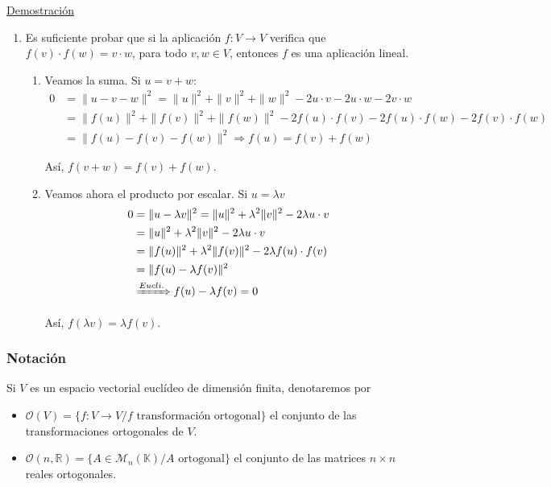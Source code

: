 \documentclass[12pt, a4paper, ones, notitlepage, openany,titlepage]{article}
\newcommand{\demostracion}{\noindent\underline{Demostración}}
\begin{document}
\demostracion
\begin{enumerate}[label=$\Longleftarrow/$]
	\item Es suficiente probar que si la aplicación $f: V \rightarrow V$ verifica que $f(v) \cdot f(w)=v \cdot w$, para todo $v, w \in V$, entonces $f$ es una aplicación lineal. 
	\begin{enumerate}[label=(\roman*)]
		\item Veamos la suma. Si $u=v+w$:
		$$
		\begin{aligned}
			0 & =\|u-v-w\|^{2}=\|u\|^{2}+\|v\|^{2}+\|w\|^{2}-2 u \cdot v-2 u \cdot w-2 v \cdot w \\
			& =\|f(u)\|^{2}+\|f(v)\|^{2}+\|f(w)\|^{2}-2 f(u) \cdot f(v)-2 f(u) \cdot f(w)-2 f(v) \cdot f(w) \\
			& =\|f(u)-f(v)-f(w)\|^{2} \Longrightarrow f(u) = f(v) + f(w)
		\end{aligned}
		$$
		
		Así, $f(v+w)=f(v)+f(w)$.
		
		\item Veamos ahora el producto por escalar. Si $u=\lambda v$
		$$
		\begin{aligned}
			0 & =\|u-\lambda v\|^{2}=\|u\|^{2}+\lambda^{2}\|v\|^{2}-2 \lambda u \cdot v \\
			& = \|u\|^2 + \lambda^2 \|v\|^2 - 2 \lambda u \cdot v \\
			& =\|f(u)\|^{2}+\lambda^{2}\|f(v)\|^{2}-2 \lambda f(u) \cdot f(v) \\
			& =\|f(u)-\lambda f(v)\|^{2} \\
			& \xRightarrow{Eucli.} f(u) - \lambda f(v) = 0
		\end{aligned}
		$$
		
		Así, $f(\lambda v)=\lambda f(v)$.
	\end{enumerate}
\end{enumerate}

\subsubsection{Notación}
Si $V$ es un espacio vectorial euclídeo de dimensión finita, denotaremos por
\begin{itemize}
	\item $\mathcal{O}(V) = \{f: V \rightarrow V / f \text{ transformación ortogonal}\}$ el conjunto de las transformaciones ortogonales de $V$.
	\item $\mathcal{O}(n, \mathbb{R}) = \{A \in \mathcal{M}_n (\mathbb{K}) / A \text{ ortogonal}\}$ el conjunto de las matrices $n \times n$ reales ortogonales.
\end{itemize}
\end{document}
